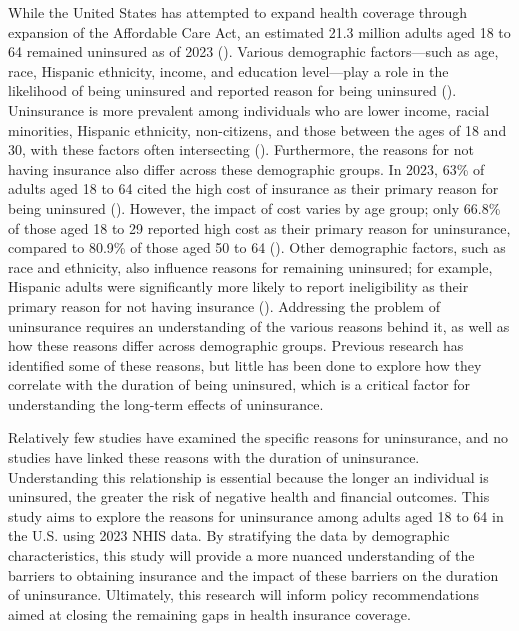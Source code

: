 \documentclass[12pt]{article}
\begin{document}
While the United States has attempted to expand health coverage through expansion of the Affordable Care Act, an estimated 21.3 million adults aged 18 to 64 remained uninsured as of 2023 (\cite{tolbert_key_2024}). Various demographic factors—such as age, race, Hispanic ethnicity, income, and education level—play a role in the likelihood of being uninsured and reported reason for being uninsured (\cite{lee_convergence_2021}). Uninsurance is more prevalent among individuals who are lower income, racial minorities, Hispanic ethnicity, non-citizens, and those between the ages of 18 and 30, with these factors often intersecting (\cite{gunja_who_2019, okoro_lack_2015, wisk_inequalities_2019}). Furthermore, the reasons for not having insurance also differ across these demographic groups. In 2023, 63\% of adults aged 18 to 64 cited the high cost of insurance as their primary reason for being uninsured (\cite{tolbert_key_2024}). However, the impact of cost varies by age group; only 66.8\% of those aged 18 to 29 reported high cost as their primary reason for uninsurance, compared to 80.9\% of those aged 50 to 64 (\cite{cha_reasons_2020}). Other demographic factors, such as race and ethnicity, also influence reasons for remaining uninsured; for example, Hispanic adults were significantly more likely to report ineligibility as their primary reason for not having insurance (\cite{cha_reasons_2020}). Addressing the problem of uninsurance requires an understanding of the various reasons behind it, as well as how these reasons differ across demographic groups. Previous research has identified some of these reasons, but little has been done to explore how they correlate with the duration of being uninsured, which is a critical factor for understanding the long-term effects of uninsurance.

Relatively few studies have examined the specific reasons for uninsurance, and no studies have linked these reasons with the duration of uninsurance. Understanding this relationship is essential because the longer an individual is uninsured, the greater the risk of negative health and financial outcomes. This study aims to explore the reasons for uninsurance among adults aged 18 to 64 in the U.S. using 2023 NHIS data. By stratifying the data by demographic characteristics, this study will provide a more nuanced understanding of the barriers to obtaining insurance and the impact of these barriers on the duration of uninsurance. Ultimately, this research will inform policy recommendations aimed at closing the remaining gaps in health insurance coverage.
\end{document}

